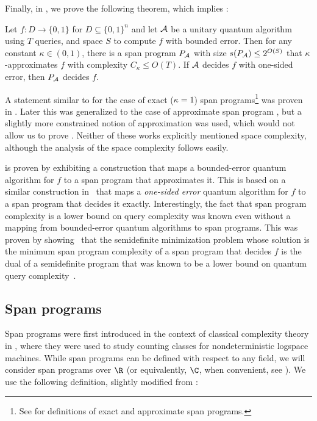 \documentclass{toc}
\begin{document}
Finally, in , we prove the following theorem, which implies :
\begin{theorem}\label{thm:alg-to-span}
Let $f:D\rightarrow \{0,1\}$ for $D\subseteq \{0,1\}^n$ and let ${\cal A}$ be a unitary quantum algorithm using $T$ queries, and space $S$ to compute $f$ with bounded error. Then for any constant $\kappa\in (0,1)$, there is a span program $P_{\cal A}$ with size $s(P_{\cal A})\leq 2^{O(S)}$ that $\kappa$-approximates $f$ with complexity $C_{\kappa}\leq O(T)$. If $\cal A$ decides $f$ with one-sided error, then $P_{\cal A}$ decides $f$. 
\end{theorem}

%
A statement similar   %
to  for the case of exact ($\kappa=1$) span programs\footnote{See  for definitions of exact and approximate span programs.} was proven in \cite{Rei09}. Later this was generalized to the case of approximate span program \cite{IJ15}, but a slightly more constrained notion of approximation was used, which would not allow us to prove . Neither of these works explicitly mentioned space complexity, although the analysis of the space complexity follows easily. 

 is proven by exhibiting a construction that maps a bounded-error quantum algorithm for $f$ to a span program that approximates it. This is based on a similar construction in~\cite{Rei09} that maps a \emph{one-sided error} quantum algorithm for $f$ to a span program that decides it exactly. Interestingly, the fact that span program complexity is a lower bound on query complexity was known even without a mapping from bounded-error quantum algorithms to span programs. This was proven by showing~\cite{Rei09} that the semidefinite minimization problem whose solution is the minimum span program complexity of a span program that decides $f$ is the dual of a semidefinite program that was known to be a lower bound on quantum query complexity~\cite{amb00,BSS03,HLS07}.   




\subsection{Span programs}\label{sec:span}

Span programs were first introduced in the context of classical complexity theory in \cite{KW93}, where they were used to study counting classes for nondeterministic logspace machines. While span programs can be defined with respect to any field, we will consider span programs over $\R$ (or equivalently, $\C$, when convenient, see ).
We use the following definition, slightly modified from \cite{KW93}:
\end{document}

